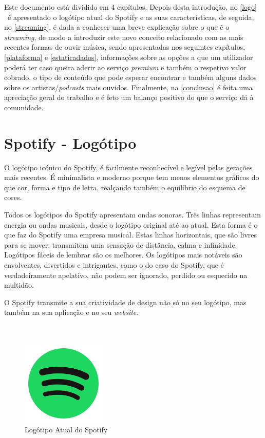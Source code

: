 Este documento está dividido em 4 capítulos.
Depois desta introdução, no \autoref{logo} \ é apresentado o logótipo atual do Spotify e as suas características, de seguida, no \autoref{streaming}, é dada a conhecer uma breve explicação sobre o que é o \textit{streaming}, de modo a introduzir este novo conceito relacionado com as mais recentes formas de ouvir música, sendo apresentadas nos seguintes capítulos, \autoref{plataforma} e \autoref{estaticadados}, informações sobre as opções a que um utilizador poderá ter caso queira aderir ao serviço \textit{premium} e também o respetivo valor cobrado, o tipo de conteúdo que pode esperar encontrar e também alguns dados sobre os artistas/\textit{podcasts} mais ouvidos. 
Finalmente, na \autoref{conclusao} é feita uma apreciação geral do trabalho e é feto um balanço positivo do que o serviço dá à comunidade.
 
\chapter{Spotify - Logótipo}
\label{logo}
O logótipo icónico do Spotify, é facilmente reconhecível e legível pelas gerações mais recentes. É minimalista e moderno porque tem menos elementos gráficos do que cor, forma e tipo de letra, realçando também o equilíbrio do esquema de cores.

Todos os logótipos do Spotify apresentam ondas sonoras. Três linhas representam energia ou ondas musicais, desde o logótipo original até ao atual. Esta forma é o que faz do Spotify uma empresa musical. Estas linhas horizontais, que são livres para se mover, transmitem uma sensação de distância, calma e infinidade.
Logótipos fáceis de lembrar são os melhores. Os logótipos mais notáveis são envolventes, divertidos e intrigantes, como o do caso do Spotify, que é verdadeiramente apelativo, não podem ser ignorado, perdido ou esquecido na multidão.

O Spotify transmite a sua criatividade de design não só no seu logótipo, mas também na sua aplicação e no seu \textit{website}.\\
\\
\\

	\begin{figure}[h!]

		\centering

		\includegraphics[width=4cm]{spotifylogo.png}

		\caption{Logótipo Atual do Spotify}

		\label{fig.logotipo}

	\end{figure} 

